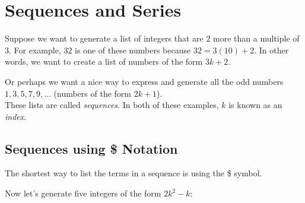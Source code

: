 \chapter{Sequences and Series}
\label{chp:sequence_and_sseries}			

Suppose we want to generate a list of integers that are $2$ more than a multiple of $3$. For example, $32$ is one of these numbers because $32 = 3(10)+2$. In other words, we want to create a list of numbers of the form $3k+2$. \\


Or perhaps we want a nice way to express and generate all the odd numbers $1,3,5,7,9,\ldots$ (numbers of the form $2k+1$).\\

These lists are called \textit{sequences}. In both of these examples, $k$ is known as an \textit{index}.

\section{Sequences using \$ Notation}


The shortest way to list the terms in a sequence is using the \$ symbol. 

\begin{maplegroup}
\begin{mapleinput}
\end{mapleinput}
\mapleresult
\begin{maplelatex}
\end{maplelatex}
\end{maplegroup}

\noindent Now let's generate five integers of the form $2k^2-k$:

\begin{maplegroup}
\begin{mapleinput}
\end{mapleinput}
\mapleresult
\begin{maplelatex}
\end{maplelatex}
\end{maplegroup}

